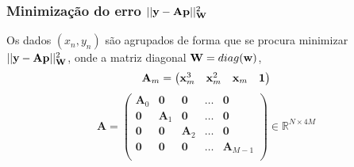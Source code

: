 \subsubsection{Minimização do erro  $||\VECTOR{y} - \mathbf{A}\VECTOR{p}||^2_{\MATRIX{W}}$}
\label{subsubsec:partz}
Os dados $(x_n,y_n)$ são agrupados de forma que se procura minimizar $||\VECTOR{y} - \mathbf{A}\VECTOR{p}||^2_{\MATRIX{W}}$, 
onde a matriz diagonal $\MATRIX{W}=diag(\VECTOR{w})$,
\begin{equation}
\mathbf{A}_m =\left(\begin{matrix}
\VECTOR{x}_m^3 & \VECTOR{x}_m^2 & \VECTOR{x}_m & \mathbf{1}
\end{matrix}\right)
\end{equation}
\begin{equation}
\mathbf{A} =\left(\begin{matrix}
\mathbf{A}_0 & \mathbf{0}   & \mathbf{0}   & \dots & \mathbf{0} \\
\mathbf{0}   & \mathbf{A}_1 & \mathbf{0}   & \dots & \mathbf{0} \\
\mathbf{0}   & \mathbf{0}   & \mathbf{A}_2 & \dots & \mathbf{0} \\
\mathbf{0}   & \mathbf{0}   & \mathbf{0}   & \dots & \mathbf{A}_{M-1} \\
\end{matrix}\right) \in \mathbb{R}^{N \times 4M}
\end{equation}

